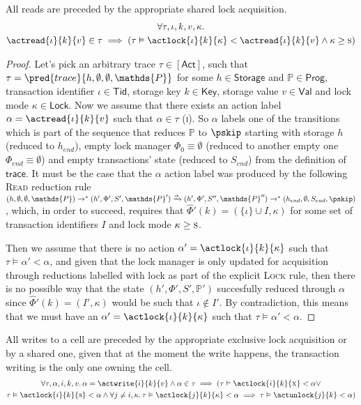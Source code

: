 \lem \label{lem:read} All reads are preceded by the appropriate shared lock acquisition.
\begin{gather*}
\forall \tau, \iota, k, v, \kappa \ldotp \\
\actread{\iota}{k}{v} \in \tau \implies \left( \tau \vDash \actlock{\iota}{k}{\kappa} < \actread{\iota}{k}{v} \land \kappa \geq \textsc{s} \right)
\end{gather*}

\begin{proof}
Let's pick an arbitrary trace $\tau \in \mathsf{[Act]}$, such that $\tau = \pred{trace}{h, \emptyset, \emptyset, \mathds{P}}$ for some $h \in \mathsf{Storage}$ and $\mathds{P} \in \mathsf{Prog}$, transaction identifier $\iota \in \mathsf{Tid}$, storage key $k \in \mathsf{Key}$, storage value $v \in \mathsf{Val}$ and lock mode $\kappa \in \mathsf{Lock}$. Now we assume that there exists an action label $\alpha = \actread{\iota}{k}{v}$ such that $\alpha \in \tau$ (\textsc{i}). So $\alpha$ labels one of the transitions which is part of the sequence that reduces $\mathds{P}$ to $\pskip$ starting with storage $h$ (reduced to $h_{end}$), empty lock manager $\Phi_0 \equiv \emptyset$ (reduced to another empty one $\Phi_{end} \equiv \emptyset$) and empty transactions' state (reduced to $S_{end}$) from the definition of $\mathsf{trace}$. It must be the case that the $\alpha$ action label was produced by the following \textsc{Read} reduction rule $(h, \emptyset, \emptyset, \mathds{P}) \rightarrow^* (h', \Phi', S', \mathds{P}') \xrightarrow{\alpha} (h', \Phi', S'', \mathds{P}'') \rightarrow^* (h_{end}, \emptyset, S_{end}, \pskip)$, which, in order to succeed, requires that $\hat{\Phi}'(k) = (\{ \iota \} \cup I, \kappa)$ for some set of transaction identifiers $I$ and lock mode $\kappa \geq \textsc{s}$.

Then we assume that there is no action $\alpha' = \actlock{\iota}{k}{\kappa}$ such that $\tau \vDash \alpha' < \alpha$, and given that the lock manager is only updated for acquisition through reductions labelled with \textsf{lock} as part of the explicit \textsc{Lock} rule, then there is no possible way that the state $(h', \Phi', S', \mathds{P}')$ succesfully reduced through $\alpha$ since $\hat{\Phi}'(k) = (I'
, \kappa)$ would be such that $\iota \not\in I'$. By contradiction, this means that we must have an $\alpha' = \actlock{\iota}{k}{\kappa}$ such that $\tau \vDash \alpha' < \alpha$.
\end{proof}

\lem \label{lem:write} All writes to a cell are preceded by the appropriate exclusive lock acquisition or by a shared one, given that at the moment the write happens, the transaction writing is the only one owning the cell.
\begin{gather*}
\forall \tau, \alpha, i, k, v \ldotp
\alpha = \actwrite{i}{k}{v} \land \alpha \in \tau \implies
(\tau \vDash \actlock{i}{k}{\textsc{x}} < \alpha \lor \\
\tau \vDash \actlock{i}{k}{\textsc{s}} < \alpha \land \forall j \neq i, \kappa \ldotp \tau \vDash \actlock{j}{k}{\kappa} < \alpha \implies \tau \vDash \actunlock{j}{k} < \alpha)
\end{gather*}

